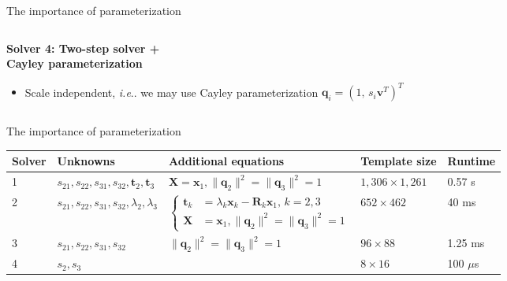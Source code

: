 \documentclass[aspectratio=169]{beamer}
\makeatletter
\newcommand{\mat}[1]{\bm{#1}}
\newcommand{\norm}[1]{\|#1\|}
\newcommand{\T}{T}
\DeclareRobustCommand\ie{\emph{i.e}\@ifnextchar.{}{.\@}}
\makeatother
\begin{document}
\begin{frame}{The importance of parameterization}
\begin{columns}
    \begin{column}{0.5\textwidth}
        \textbf{Solver 4: Two-step solver + \\Cayley parameterization}

        \begin{itemize}
            \item Scale independent, \ie{} we may use Cayley parameterization $\mat{q}_i = (1,\,s_i\mat{v}^\T)^\T$
        \end{itemize}

    \end{column}%
    \begin{column}{0.5\textwidth}
        \centering
        
    \end{column}
\end{columns}
\end{frame}

\begin{frame}{The importance of parameterization}
    \begin{center}
        \small
    \begin{tabular}{lllll}\hline
        Solver & Unknowns & Additional equations & Template size & Runtime \\\hline
        1 & $s_{21}, s_{22}, s_{31}, s_{32}, \mat{t}_2, \mat{t}_3$ & $\mat{X}=\mat{x}_1, \norm{\mat{q}_2}^2=\norm{\mat{q}_3}^2=1$ & $1,306\times 1,261$ & 0.57 s \\
        2 & $s_{21}, s_{22}, s_{31}, s_{32}, \lambda_2, \lambda_3$ &
$
    \left\{
    \begin{aligned}
        \mat{t}_k &= \lambda_k\mat{x}_k-\mat{R}_k\mat{x}_1,\,k=2,3\\
        \mat{X} &=\mat{x}_1, \norm{\mat{q}_2}^2=\norm{\mat{q}_3}^2=1
    \end{aligned}
    \right.
$
     & $652\times 462$ & 40 ms \\
        3 & $s_{21}, s_{22}, s_{31}, s_{32}$ & $\norm{\mat{q}_2}^2=\norm{\mat{q}_3}^2=1$ & $96\times 88$ & 1.25 ms \\
        4 & $s_{2}, s_{3}$ & & $8\times 16$ & 100 $\mu$s \\
    \end{tabular}
\end{center}
\end{frame}
\end{document}
